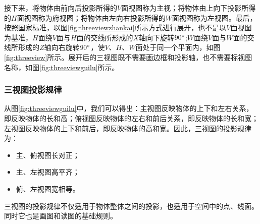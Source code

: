 接下来，将物体由前向后投影所得的$V$面视图称为主视；将物体由上向下投影所得的$H$面视图称为府视图；将物体由左向右投影所得的$W$面视图称为左视图。最后，按照国家标准，以图\ref{fig:threeviewzhankai}所示方式进行展开，也不是以$V$面视图为基准，$H$面绕$V$面与$H$面的交线所形成的$X$轴向下旋转$90\degree$;$W$面绕$V$面与$W$面的交线所形成的$Z$轴向右旋转$90\degree$，使$V$、$H$、$W$面处于同一个平面内，如图\ref{fig:threeview}所示。展开后的三视图既不需要画边框和投影轴，也不需要标视图名称，如图\ref{fig:threeviewguilu}所示。
\subsubsection{三视图投影规律}
从图\ref{fig:threeviewguilu}中，我们可以得出：主视图反映物体的上下和左右关系，即反映物体的长和高；俯视图反映物体的左右和前后关系，即反映物体的长和宽；左视图反映物体的上下和前后，即反映物体的高和宽。因此，三视图的投影规律为：
\begin{itemize}
\item 主、俯视图长对正；
\item 主、左视图高平齐；
\item 俯、左视图宽相等。
\end{itemize}

三视图的投影规律不仅适用于物体整体之间的投影，也适用于空间中的点、线面。同时它也是画图和读图的基础规则。

